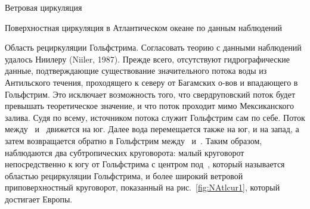 \begin{chapter}{Ветровая циркуляция}
\begin{section}{Поверхностная циркуляция в Атлантическом океане по данным наблюдений}
\begin{paragraph}{Область рециркуляции Гольфстрима.}
Согласовать теорию с данными наблюдений удалось Ниилеру (Niiler, 1987).
Прежде всего, отсутствуют гидрографические данные, подтверждающие 
существование значительного потока воды из Антильского течения, проходящего
к северу от Багамских о-вов и впадающего в Гольфстрим. Это исключает 
возможность того, что свердруповский поток будет превышать теоретическое значение,
и что поток проходит мимо Мексиканского залива. Судя по всему, источником 
потока служит Гольфстрим сам по себе. Поток между~ 
и~ движется на юг. Далее вода перемещается также на юг, 
и на запад, а затем возвращается обратно в Гольфстрим между~ 
и~. Таким образом, наблюдаются два субтропических круговорота:
малый круговорот непосредственно к югу от Гольфстрима с центром 
под~, который называется областью рециркуляции Гольфстрима,
и более широкий ветровой приповерхностный круговорот, показанный 
на рис.~\ref{fig:NAtlcur1}, который достигает Европы.
%


\end{paragraph}
\end{section}
\end{chapter}
